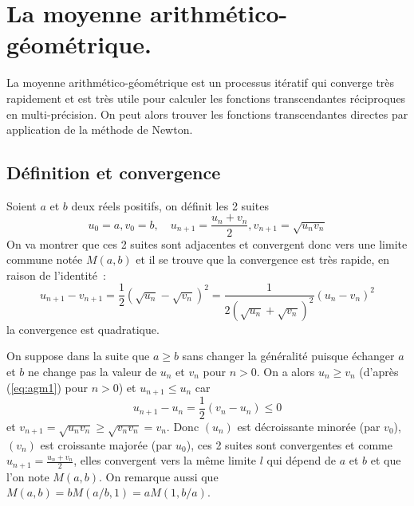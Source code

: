 \documentclass[a4paper,11pt]{article}
\begin{document}
\section{La moyenne arithm\'etico-g\'eom\'etrique.}
\label{sec:agm}
La moyenne arithm\'etico-g\'eom\'etrique est un processus it\'eratif
qui converge tr\`es rapidement et est tr\`es utile pour calculer
les fonctions transcendantes r\'eciproques en multi-pr\'ecision. 
On peut alors trouver les fonctions transcendantes directes
par application de la m\'ethode de Newton.

\subsection{D\'efinition et convergence}
Soient $a$ et $b$ deux r\'eels positifs,
on d\'efinit les 2 suites 
\begin{equation} \label{eq:agm}
 u_0=a, v_0=b, \quad u_{n+1}=\frac{u_n+v_n}{2}, v_{n+1}=\sqrt{u_nv_n} 
\end{equation}
On va montrer que ces 2 suites sont adjacentes et convergent donc vers
une limite commune not\'ee $M(a,b)$ et il se trouve que la convergence
est tr\`es rapide, en raison de l'identit\'e~:
\begin{equation} \label{eq:agm1}
u_{n+1}-v_{n+1}=\frac{1}{2}(\sqrt{u_n}-\sqrt{v_n})^2
=\frac{1}{2(\sqrt{u_n}+\sqrt{v_n})^2}(u_n-v_n)^2
\end{equation}
la convergence est quadratique.

On suppose dans la suite que $a\geq b$ sans changer la généralité puisque échanger $a$ et $b$
ne change pas la valeur de $u_n$ et $v_n$ pour $n>0$. On a alors $u_n \geq v_n$ 
(d'après (\ref{eq:agm1}) pour $n>0$) et $u_{n+1} \leq u_n$ car
\[ u_{n+1}-u_n=\frac{1}{2}(v_n-u_{n}) \leq 0\]
et $v_{n+1}=\sqrt{u_nv_n} \geq \sqrt{v_nv_n}=v_n$. Donc $(u_n)$ est décroissante 
minorée (par $v_0$), $(v_n)$ est croissante majorée (par $u_0$), ces 2 suites sont 
convergentes et comme $u_{n+1}=\frac{u_n+v_n}{2}$, elles convergent vers la même limite 
$l$ qui d\'epend de $a$ et $b$ et que l'on note $M(a,b)$.
On remarque aussi que $M(a,b)=bM(a/b,1)=aM(1,b/a)$. 
\end{document}
